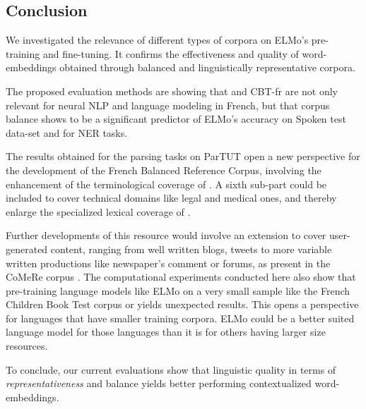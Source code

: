 \subsection{Conclusion} \label{sec:Concl}

We investigated the relevance of different types of corpora on ELMo's pre-training and fine-tuning. It confirms the effectiveness and quality of word-embeddings obtained through balanced and linguistically representative corpora.

The proposed evaluation methods are showing that \Cabernet and CBT-fr are not only relevant for neural NLP and language modeling in French, but that corpus balance shows to be a significant predictor of ELMo's accuracy on Spoken test data-set and for NER tasks.

The results obtained for the parsing tasks on ParTUT open a new perspective for the development of the French Balanced Reference Corpus, involving the enhancement of the terminological coverage of \Cabernet. A sixth sub-part could be included to cover technical domains like legal and medical ones, and thereby enlarge the specialized lexical coverage of \Cabernet.

Further developments of this resource would involve an extension to cover user-generated content, ranging from well written blogs, tweets to more variable written productions like newspaper's comment or forums, as present in the CoMeRe corpus \citep{chanier-etal-2014-the}. The computational experiments conducted here also show that pre-training language models like ELMo on a very small sample like the French Children Book Test corpus or \Cabernet yields unexpected results. This opens a perspective for languages that have smaller training corpora. ELMo could be a better suited language model for those languages than it is for others having larger size resources.

To conclude, our current evaluations show that linguistic quality in terms of \emph{representativeness} and balance yields better performing contextualized word-embeddings.
